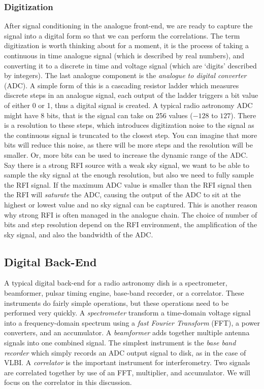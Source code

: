 \documentclass[usenatbib,usegraphicx]{article}
\begin{document}
\subsubsection{Digitization}

After signal conditioning in the analogue front-end, we are ready to capture the signal into a digital form so that we can perform the correlations.
The term digitization is worth thinking about for a moment, it is the process of taking a continuous in time analogue signal (which is described by real numbers), and converting it to a discrete in time and voltage signal (which are `digits' described by integers).
The last analogue component is the \emph{analogue to digital converter} (ADC).
A simple form of this is a cascading resistor ladder which measures discrete steps in an analogue signal, each output of the ladder triggers a bit value of either 0 or 1, thus a digital signal is created.
A typical radio astronomy ADC might have 8 bits, that is the signal can take on 256 values ($-128$ to $127$).
There is a resolution to these steps, which introduces digitization noise to the signal as the continuous signal is truncated to the closest step.
You can imagine that more bits will reduce this noise, as there will be more steps and the resolution will be smaller.
Or, more bits can be used to increase the dynamic range of the ADC.
Say there is a strong RFI source with a weak sky signal, we want to be able to sample the sky signal at the enough resolution, but also we need to fully sample the RFI signal.
If the maximum ADC value is smaller than the RFI signal then the RFI will \emph{saturate} the ADC, causing the output of the ADC to sit at the highest or lowest value and no sky signal can be captured.
This is another reason why strong RFI is often managed in the analogue chain.
The choice of number of bits and step resolution depend on the RFI environment, the amplification of the sky signal, and also the bandwidth of the ADC.

\subsection{Digital Back-End}

A typical digital back-end for a radio astronomy dish is a spectrometer, beamformer, pulsar timing engine, base-band recorder, or a correlator.
These instruments do fairly simple operations, but these operations need to be performed very quickly.
A \emph{spectrometer} transform a time-domain voltage signal into a frequency-domain spectrum using a \emph{fast Fourier Transform} (FFT), a power converters, and an accumulator.
A \emph{beamformer} adds together multiple antenna signals into one combined signal.
The simplest instrument is the \emph{base band recorder} which simply records an ADC output signal to disk, as in the case of VLBI.
A \emph{correlator} is the important instrument for interferometry.
Two signals are correlated together by use of an FFT, multiplier, and accumulator.
We will focus on the correlator in this discussion.
\end{document}
